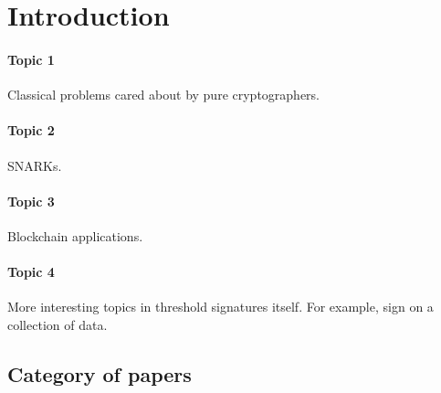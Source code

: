 \section{Introduction}

\paragraph{Topic 1} Classical problems cared about by pure cryptographers. 
\paragraph{Topic 2} SNARKs. 
\paragraph{Topic 3} Blockchain applications.  
\paragraph{Topic 4} More interesting topics in threshold signatures itself. 
For example, sign on a collection of data. 


\subsection{Category of papers}

